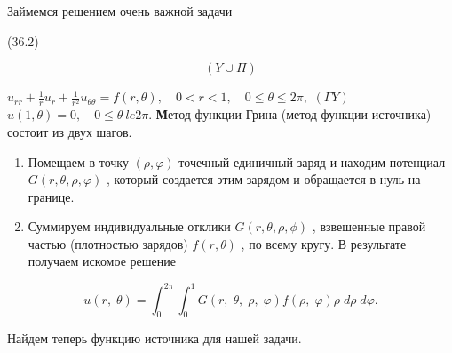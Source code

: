 \documentclass[
  ukrainian,
]{article}
\begin{document}
Займемся решением очень важной задачи

(36.2)

\[
(Y \cup \Pi)
\]

\(u_{rr} + \frac{1}{r} u_r + \frac{1}{r^2} u_{\theta\theta} = f(r, \theta), \quad 0 < r < 1, \quad 0 \le \theta \le 2\pi,\)
\((\Gamma Y)\) \(u(1, \theta) = 0, \quad 0 \le \theta \ le 2\pi.\)
\textbf{М}етод функции Грина (метод функции источника) состоит из двух
шагов.

\begin{enumerate}
\def\labelenumi{\arabic{enumi}.}
\item
  Помещаем в точку \((\rho, \varphi)\) точечный единичный заряд и
  находим потенциал \(G(r, \theta, \rho, \varphi)\) , который создается
  этим зарядом и обращается в нуль на границе.
\item
  Суммируем индивидуальные отклики \(G(r, \theta, \rho, \phi)\) ,
  взвешенные правой частью (плотностью зарядов) \(f(r, \theta)\) , по
  всему кругу. В результате получаем искомое решение
\end{enumerate}

\[
u\left(r,\;\theta\right) = \int_{0}^{2\pi} \int_{0}^{1} G\left(r,\;\theta,\;\rho,\;\varphi\right) f\left(\rho,\;\varphi\right) \rho \; d\rho \; d\varphi.
\]

Найдем теперь функцию источника для нашей задачи.
\end{document}
